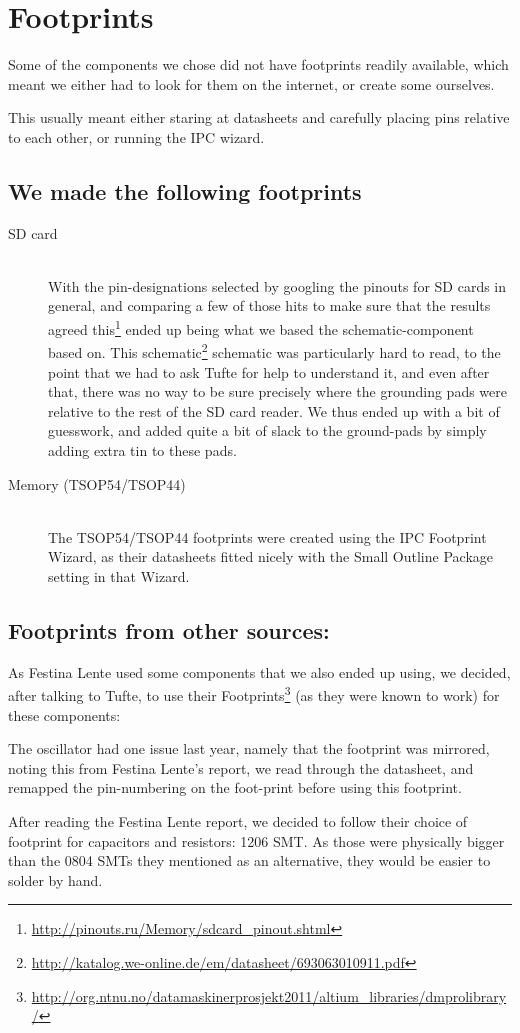 \section {Footprints}
Some of the components we chose did not have footprints readily available, which
meant we either had to look for them on the internet, or create some ourselves.

This usually meant either staring at datasheets and carefully placing pins
relative to each other, or running the IPC wizard.

\subsection{We made the following footprints}

\begin{description}
\item[SD card] \hfill
\\
  With the pin-designations selected by googling the pinouts for
  \ac{SD} cards in general, and comparing a few of those hits to make sure that
  the results agreed
  this\footnote{\url{http://pinouts.ru/Memory/sdcard_pinout.shtml}} ended up
  being what we based the schematic-component based on. This
  schematic\footnote{\url{http://katalog.we-online.de/em/datasheet/693063010911.pdf}}
  schematic was particularly hard to read, to the point that we had to ask Tufte
  for help to understand it, and even after that, there was no way to be sure
  precisely where the grounding pads were relative to the rest of the \ac{SD}
  card reader. We thus ended up with a bit of guesswork, and added quite a bit
  of slack to the ground-pads by simply adding extra tin to these pads.
\item[Memory (TSOP54/TSOP44)] \hfill
\\
  The TSOP54/TSOP44 footprints were created using
  the IPC Footprint Wizard, as their datasheets fitted nicely with the Small
  Outline Package setting in that Wizard.
\end{description}

\subsection{Footprints from other sources:}
As Festina Lente used some components that we also ended up using, we decided,
after talking to Tufte, to use their Footprints\footnote{\url{http://org.ntnu.no/datamaskinerprosjekt2011/altium_libraries/dmprolibrary/}}
(as they were known to work) for these components:


The oscillator had one issue last year, namely that the
footprint was mirrored, noting this from Festina Lente's report, we read
through the datasheet, and remapped the pin-numbering on the foot-print 
before using this footprint.

After reading the Festina Lente report\cite{berg2011festinalente}, we decided to
follow their choice of footprint for capacitors and resistors: 1206 SMT. As
those were physically bigger than the 0804 SMTs they mentioned as an
alternative, they would be easier to solder by hand.
